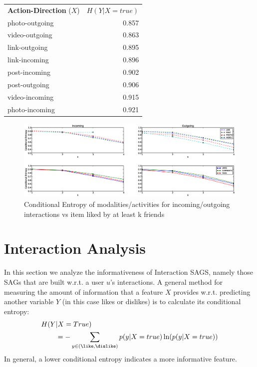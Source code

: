 \begin{table}
{\begin{tabular}{| >{\small}l | >{\small}r | }
\multicolumn{2}{c}{}\\
                \hline	
		\textbf{Action-Direction} ($X$) & $H(Y|X=true)$ \\
		\hline
		photo-outgoing & 0.857 \\
		video-outgoing & 0.863 \\
		link-outgoing & 0.895 \\
		link-incoming & 0.896 \\
		post-incoming & 0.902 \\
		post-outgoing & 0.906 \\
		video-incoming & 0.915 \\
		photo-incoming & 0.921 \\
		\hline
				
	\end{tabular}}
\end{table}

\begin{figure}[tbp!]
\hspace{-15mm}\includegraphics[width=210mm]{data/plots/vsk/ModalityActionsvsKFriends.eps}
\caption{Conditional Entropy  of modalities/activities for incoming/outgoing interactions vs item liked by at least k friends}
\label{Fig2}
\end{figure}

\section{Interaction Analysis}

In this section we analyze the informativeness of Interaction SAGS,
namely those SAGs that are built w.r.t. a user $u$'s interactions.
A general method for measuring the amount of information that a 
feature $X$ provides w.r.t. predicting another variable $Y$ (in this
case likes or dislikes) is to calculate its conditional entropy:
\begin{align*}
H(Y&|X=True)\\
& = -\sum_{y\in{(\like,\dislike)}} p(y|X=true) \ln( p(y|X=true))
\end{align*}
In general, a lower conditional entropy indicates a more informative
feature.

